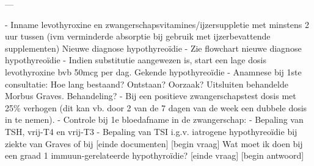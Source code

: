 \begin{wrapverbatim}
---

- Inname levothyroxine en zwangerschapsvitamines/ijzersuppletie met minstens 2 uur 
tussen (ivm verminderde absorptie bij gebruik met ijzerbevattende supplementen)
Nieuwe diagnose hypothyreoïdie
- Zie flowchart nieuwe diagnose hypothyreoïdie
- Indien substitutie aangewezen is, start een lage dosis levothyroxine bvb 50mcg per 
dag.
Gekende hypothyreoïdie
- Anamnese bij 1ste consultatie: Hoe lang bestaand? Ontstaan? Oorzaak? Uitsluiten 
behandelde Morbus Graves. Behandeling?
- Bij een positieve zwangerschapstest dosis met 25\% verhogen (dit kan vb. door 2 van 
de 7 dagen van de week een dubbele dosis in te nemen).
- Controle bij 1e bloedafname in de zwangerschap:
- Bepaling van TSH, vrij-T4 en vrij-T3
- Bepaling van TSI i.g.v. iatrogene hypothyreoïdie bij ziekte van Graves of bij
[einde documenten]
[begin vraag]
Wat moet ik doen bij een graad 1 immuun-gerelateerde hypothyroïdie?
[einde vraag]
[begin antwoord]

\end{wrapverbatim}

